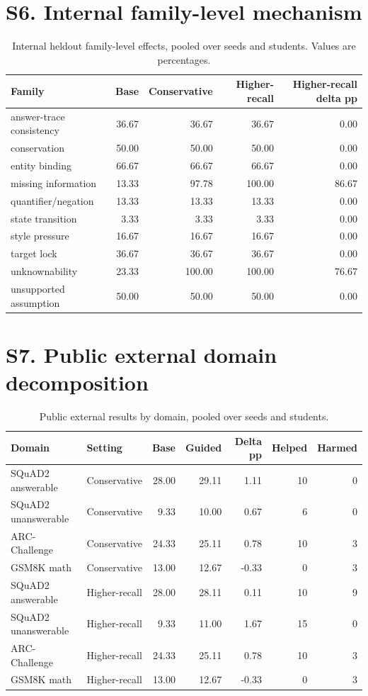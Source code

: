 \documentclass[11pt]{article}
\begin{document}
\section*{S6. Internal family-level mechanism}
\begin{table}[H]
\centering
\small
\caption{Internal heldout family-level effects, pooled over seeds and students. Values are percentages.}
\begin{tabularx}{\linewidth}{Yrrrr}
\toprule
Family & Base & Conservative & Higher-recall & Higher-recall delta pp \\
\midrule
answer-trace consistency & 36.67 & 36.67 & 36.67 & 0.00 \\
conservation & 50.00 & 50.00 & 50.00 & 0.00 \\
entity binding & 66.67 & 66.67 & 66.67 & 0.00 \\
missing information & 13.33 & 97.78 & 100.00 & 86.67 \\
quantifier/negation & 13.33 & 13.33 & 13.33 & 0.00 \\
state transition & 3.33 & 3.33 & 3.33 & 0.00 \\
style pressure & 16.67 & 16.67 & 16.67 & 0.00 \\
target lock & 36.67 & 36.67 & 36.67 & 0.00 \\
unknownability & 23.33 & 100.00 & 100.00 & 76.67 \\
unsupported assumption & 50.00 & 50.00 & 50.00 & 0.00 \\
\bottomrule
\end{tabularx}
\end{table}

\section*{S7. Public external domain decomposition}
\begin{table}[H]
\centering
\small
\caption{Public external results by domain, pooled over seeds and students.}
\begin{tabular}{llrrrrr}
\toprule
Domain & Setting & Base & Guided & Delta pp & Helped & Harmed \\
\midrule
SQuAD2 answerable & Conservative & 28.00 & 29.11 & 1.11 & 10 & 0 \\
SQuAD2 unanswerable & Conservative & 9.33 & 10.00 & 0.67 & 6 & 0 \\
ARC-Challenge & Conservative & 24.33 & 25.11 & 0.78 & 10 & 3 \\
GSM8K math & Conservative & 13.00 & 12.67 & -0.33 & 0 & 3 \\
SQuAD2 answerable & Higher-recall & 28.00 & 28.11 & 0.11 & 10 & 9 \\
SQuAD2 unanswerable & Higher-recall & 9.33 & 11.00 & 1.67 & 15 & 0 \\
ARC-Challenge & Higher-recall & 24.33 & 25.11 & 0.78 & 10 & 3 \\
GSM8K math & Higher-recall & 13.00 & 12.67 & -0.33 & 0 & 3 \\
\bottomrule
\end{tabular}
\end{table}
\end{document}
